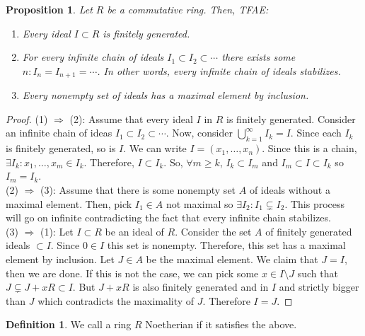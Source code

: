 \documentclass{article}
\theoremstyle{definition}
\newtheorem{definition}{Definition}[subsection]
\theoremstyle{remark}
\theoremstyle{plain}
\newtheorem{prop}{Proposition}[subsection]
\begin{document}
\begin{prop}
    Let \(R\) be a commutative ring. Then, TFAE:
    \begin{enumerate}
        \item Every ideal \(I \subset R\) is finitely generated.
        \item For every infinite chain of ideals \(I_1 \subset I_2 \subset \cdots\) there exists some \(n: I_n = I_{n+1} = \cdots\). 
        In other words, every infinite chain of ideals stabilizes. 
        \item Every nonempty set of ideals has a maximal element by inclusion.
    \end{enumerate}
\end{prop}
\begin{proof}
    (1) \(\Rightarrow\) (2): Assume that every ideal \(I\) in \(R\) is finitely generated. Consider an infinite chain of ideas \(I_1 \subset I_2 \subset \cdots\).
    Now, consider \(\bigcup\limits_{k =1}^{\infty} I_k = I\). Since each \(I_k\) is finitely generated, so is \(I\). We can write \(I = (x_1, \ldots, x_n)\). Since this is a chain, 
    \(\exists I_k: x_1, \ldots, x_m \in I_k\). Therefore, \(I \subset I_k\). So, \(\forall m \geq k\), \(I_k \subset I_m\) and \(I_m \subset I \subset I_k\) so \(I_m = I_k\).\\
    (2) \(\Rightarrow\) (3): Assume that there is some nonempty set \(A\) of ideals without a maximal element. Then, pick \(I_1 \in A\) not maximal so \(\exists I_2: I_1 \subsetneq I_2\). 
    This process will go on infinite contradicting the fact that every infinite chain stabilizes.\\
    (3) \(\Rightarrow\) (1): Let \(I \subset R\) be an ideal of \(R\). Consider the set \(A\) of finitely generated ideals \(\subset I\). Since \(0 \in I\) this set 
    is nonempty. Therefore, this set has a maximal element by inclusion. Let \(J \in A\) be the maximal element. We claim that \(J = I\), then we are done.
    If this is not the case, we can pick some \(x\in I\setminus J\) such that \(J \subsetneq J + xR \subset I\). But \(J+xR\) is also finitely generated and in \(I\) and strictly bigger than \(J\) which
    contradicts the maximality of \(J\). Therefore \(I = J\).
\end{proof}

\begin{definition}
    We call a ring \(R\) Noetherian if it satisfies the above.
\end{definition}
\end{document}

